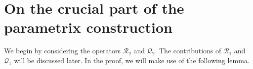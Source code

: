 \documentclass[12pt]{amsart}
\newtheorem{lemma}[theorem]{Lemma}
\begin{document}
\section{On the crucial part of the parametrix construction }\label{sec3}

We begin by considering the operators $\mathcal{R}_2$ and $\mathcal{Q}_2$. The contributions of $\mathcal{R}_1$ and $\mathcal{Q}_1$ will be discussed later. In the proof, we will make use of the following lemma.










 


\end{document}
